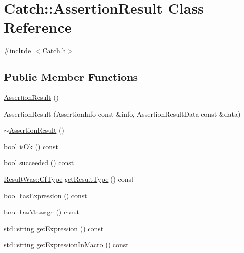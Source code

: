 \hypertarget{class_catch_1_1_assertion_result}{}\section{Catch\+:\+:Assertion\+Result Class Reference}
\label{class_catch_1_1_assertion_result}


{\ttfamily \#include $<$Catch.\+h$>$}

\subsection*{Public Member Functions}
\begin{DoxyCompactItemize}
\item 
\hyperlink{class_catch_1_1_assertion_result_a570b999c5f66e33cb31d3adb29fec25b}{Assertion\+Result} ()
\item 
\hyperlink{class_catch_1_1_assertion_result_ab58aeec27052ba400633ed0e36cea692}{Assertion\+Result} (\hyperlink{struct_catch_1_1_assertion_info}{Assertion\+Info} const \&info, \hyperlink{struct_catch_1_1_assertion_result_data}{Assertion\+Result\+Data} const \&\hyperlink{_s_d_l__opengl_8h_a2e335d56e2846b0fea47eed068b2d34a}{data})
\item 
\hyperlink{class_catch_1_1_assertion_result_abf90f5abd04d38b2fb4f5d575bdc4f1e}{$\sim$\+Assertion\+Result} ()
\item 
bool \hyperlink{class_catch_1_1_assertion_result_a70fb6aa62a38db3bdcafb4bb134afb21}{is\+Ok} () const 
\item 
bool \hyperlink{class_catch_1_1_assertion_result_a5404062147930354afeb154de7cbaa7e}{succeeded} () const 
\item 
\hyperlink{struct_catch_1_1_result_was_a624e1ee3661fcf6094ceef1f654601ef}{Result\+Was\+::\+Of\+Type} \hyperlink{class_catch_1_1_assertion_result_aa90bec8064879a62fcdc8e1079bcdba1}{get\+Result\+Type} () const 
\item 
bool \hyperlink{class_catch_1_1_assertion_result_a45551f4f092c640ffce0cdd8a94f4b62}{has\+Expression} () const 
\item 
bool \hyperlink{class_catch_1_1_assertion_result_ab22a1c9baa182aeb2549fffeb8294d9e}{has\+Message} () const 
\item 
\hyperlink{_s_d_l__opengl__glext_8h_ae84541b4f3d8e1ea24ec0f466a8c568b}{std\+::string} \hyperlink{class_catch_1_1_assertion_result_a6105300b90d66b5c11b69813f83d074d}{get\+Expression} () const 
\item 
\hyperlink{_s_d_l__opengl__glext_8h_ae84541b4f3d8e1ea24ec0f466a8c568b}{std\+::string} \hyperlink{class_catch_1_1_assertion_result_ac368a7490af7669decd58efea7d7dc54}{get\+Expression\+In\+Macro} () const 

\end{DoxyCompactItemize}
